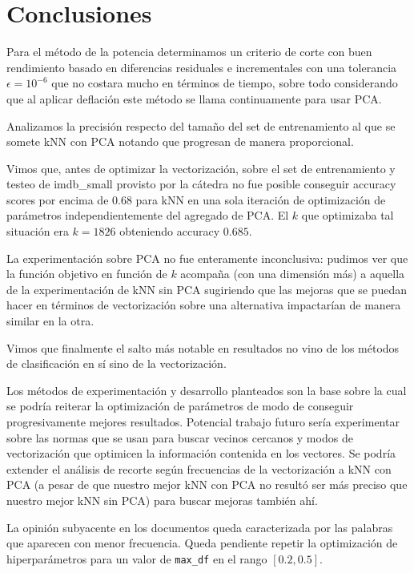 \section{Conclusiones}%

Para el método de la potencia determinamos un criterio de corte con buen rendimiento basado en diferencias residuales e incrementales con una tolerancia $\epsilon = 10^{-6}$ que no costara mucho en términos de tiempo, sobre todo considerando que al aplicar deflación este método se llama continuamente para usar PCA.

Analizamos la precisión respecto del tamaño del set de entrenamiento al que se somete kNN con PCA notando que progresan de manera proporcional.

Vimos que, antes de optimizar la vectorización, sobre el set de entrenamiento y testeo de imdb\_small provisto por la cátedra no fue posible conseguir accuracy scores por encima de $0.68$ para kNN en una sola iteración de optimización de parámetros independientemente del agregado de PCA. El $k$ que optimizaba tal situación era $k=1826$ obteniendo accuracy $0.685$.

La experimentación sobre PCA no fue enteramente inconclusiva: pudimos ver que la función objetivo en función de $k$ acompaña (con una dimensión más) a aquella de la experimentación de kNN sin PCA sugiriendo que las mejoras que se puedan hacer en términos de vectorización sobre una alternativa impactarían de manera similar en la otra.

Vimos que finalmente el salto más notable en resultados no vino de los métodos de clasificación en sí sino de la vectorización.


Los métodos de experimentación y desarrollo planteados son la base sobre la cual se podría reiterar la optimización de parámetros de modo de conseguir progresivamente mejores resultados.
Potencial trabajo futuro sería experimentar sobre las normas que se usan para buscar vecinos cercanos y modos de vectorización que optimicen la información contenida en los vectores. Se podría extender el análisis de recorte según frecuencias de la vectorización a kNN con PCA (a pesar de que nuestro mejor kNN con PCA no resultó ser más preciso que nuestro mejor kNN sin PCA) para buscar mejoras también ahí.

La opinión subyacente en los documentos queda caracterizada por las palabras
que aparecen con menor frecuencia. Queda pendiente repetir la optimización de
hiperparámetros para un valor de \texttt{max\_df} en el rango $[0.2, 0.5]$.
\label{sec:conclusiones}
